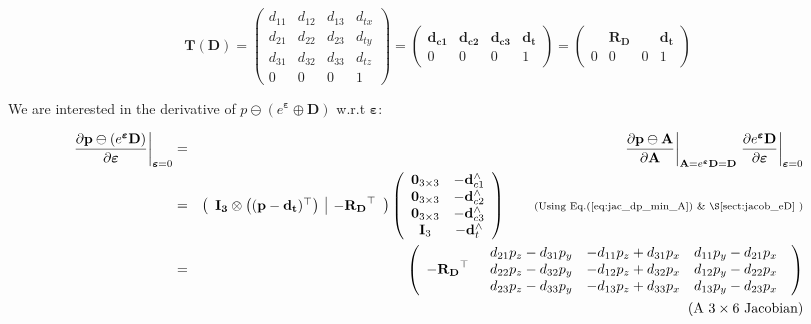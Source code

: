 \documentclass[a4paper,11pt]{report}
\newcommand{\E}{{\bm{\varepsilon}}}
\newcommand{\hatop}[1]{#1^\wedge}
\begin{document}
\begin{equation}
\mathbf{T}(\mathbf{D}) =
\left(
\begin{array}{ccc|c}
 d_{11} & d_{12} & d_{13} & d_{tx}   \\
 d_{21} & d_{22} & d_{23} & d_{ty}   \\
 d_{31} & d_{32} & d_{33} & d_{tz}   \\
\hline
  0 & 0 & 0 & 1
\end{array}
\right)
=
\left(
\begin{array}{ccc|c}
 \mathbf{d_{c1}}  & \mathbf{d_{c2}}  & \mathbf{d_{c3}}  & \mathbf{d_{t}}  \\
\hline
  0 & 0 & 0 & 1
\end{array}
\right)
=
\left(
\begin{array}{ccc|c}
   & \mathbf{R_D}  &  & \mathbf{d_{t}}  \\
\hline
  0 & 0 & 0 & 1
\end{array}
\right)
\end{equation}

We are interested in the derivative of $p \ominus (e^\E \oplus \mathbf{D})$ w.r.t $\E$:

\begin{eqnarray}
\label{eq:jacob_p_min_eD_e}
\left. \frac{\partial \mathbf{p} \ominus (e^\E \mathbf{D}) }{\partial \E} \right|_{\E = 0}
&=&
\left. \frac{\partial \mathbf{p} \ominus \mathbf{A} }{\partial \mathbf{A} } \right|_{\mathbf{A}=e^\E \mathbf{D} = \mathbf{D}}
\left. \frac{\partial e^\E \mathbf{D}}{\partial \E} \right|_{\E=0}
\nonumber \\
&=&
\left(
\begin{array}{c|c}
 \mathbf{I_3} \otimes \left( (\mathbf{p}-\mathbf{d_t})^\top \right)
 &
 -\mathbf{R_D}^\top
\end{array}
\right)
\left(
\begin{array}{cc}
 \mathbf{0}_{3\times 3}  & -\hatop{\mathbf{d}}_{c1} \\
 \mathbf{0}_{3\times 3}  & -\hatop{\mathbf{d}}_{c2} \\
 \mathbf{0}_{3\times 3}  & -\hatop{\mathbf{d}}_{c3} \\
 \mathbf{I}_{3}  & -\hatop{\mathbf{d}}_{t} \\
\end{array}
\right)
\quad\quad \text{\scriptsize{(Using Eq.(\ref{eq:jac_dp_min_A})  \& \S\ref{sect:jacob_eD}} )}
\nonumber \\
&=&
\left(
\begin{array}{cc}
   -\mathbf{R_D}^\top &
  \begin{array}{ccc}
  d_{21} p_z - d_{31} p_y & - d_{11} p_z + d_{31} p_x & d_{11} p_y - d_{21} p_x \\
  d_{22} p_z - d_{32} p_y & - d_{12} p_z + d_{32} p_x & d_{12} p_y - d_{22} p_x \\
  d_{23} p_z - d_{33} p_y & - d_{13} p_z + d_{33} p_x & d_{13} p_y - d_{23} p_x \\
  \end{array}
\end{array}
\right) \\
 && \quad\quad \quad\quad\quad \text{(A $3 \times 6$ Jacobian)} \nonumber
\end{eqnarray}
\end{document}

